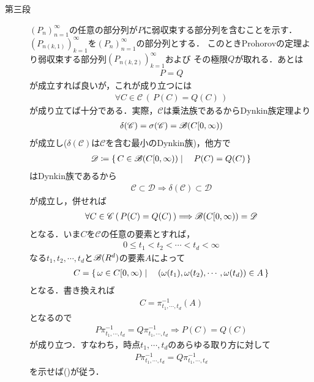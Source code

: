 \begin{sketch}
\begin{description}
			\item[第三段]
				$(P_n)_{n=1}^\infty$の任意の部分列が$P$に弱収束する部分列を含むことを示す．
				$\left(P_{n(k,1)}\right)_{k=1}^\infty$を$(P_n)_{n=1}^\infty$の部分列とする．
				このときProhorovの定理より弱収束する部分列$\left(P_{n(k,2)}\right)_{k=1}^\infty$および
				その極限$Q$が取れる．あとは
				\begin{align}
					P = Q
				\end{align}
				が成立すれば良いが，これが成り立つには
				\begin{align}
					\forall C \in \mathscr{C}\, (\, P(C) = Q(C)\, )
					\label{eq:chapter_2_Theorem_4_15_2}
				\end{align}
				が成り立てば十分である．実際，$\mathscr{C}$は乗法族であるからDynkin族定理より
				\begin{align}
					\delta(\mathscr{C}) = \sigma(\mathscr{C}) = \mathscr{B}(C[0,\infty))
				\end{align}
				が成立し($\delta(\mathscr{C})$は$\mathscr{C}$を含む最小のDynkin族)，他方で
				\begin{align}
					\mathscr{D} \coloneqq \left\{\, C \in \mathscr{B}(C[0,\infty)) \mid \quad P(C) = Q(C)\, \right\}
				\end{align}
				はDynkin族であるから
				\begin{align}
					\mathscr{C} \subset \mathscr{D} \Longrightarrow \delta(\mathscr{C}) \subset \mathscr{D}
				\end{align}
				が成立し，併せれば
				\begin{align}
					\forall C \in \mathscr{C}\, (\, P(C) = Q(C)\, )
					\Longrightarrow \mathscr{B}(C[0,\infty)) = \mathscr{D} 
				\end{align}
				となる．いま$C$を$\mathscr{C}$の任意の要素とすれば，
				\begin{align}
					0 \leq t_1 < t_2 < \cdots < t_d < \infty
				\end{align}
				なる$t_1,t_2,\cdots,t_d$と$\mathscr{B}(R^d)$の要素$A$によって
				\begin{align}
					C = \left\{\, \omega \in C[0,\infty) \mid \quad (\omega(t_1),\omega(t_2),\cdots,\omega(t_d)) \in A\, \right\}
				\end{align}
				となる．書き換えれば
				\begin{align}
					C = \pi_{t_1,\cdots,t_d}^{-1}(A)
				\end{align}
				となるので
				\begin{align}
					P\pi_{t_1,\cdots,t_d}^{-1} = Q\pi_{t_1,\cdots,t_d}^{-1}
					\Longrightarrow P(C) = Q(C)
				\end{align}
				が成り立つ．すなわち，時点$t_1,\cdots,t_d$のあらゆる取り方に対して
				\begin{align}
					P\pi_{t_1,\cdots,t_d}^{-1} = Q\pi_{t_1,\cdots,t_d}^{-1}
					\label{eq:chapter_2_Theorem_4_15_1}
				\end{align}
				を示せば()が従う．
				

\end{description}
\end{sketch}
